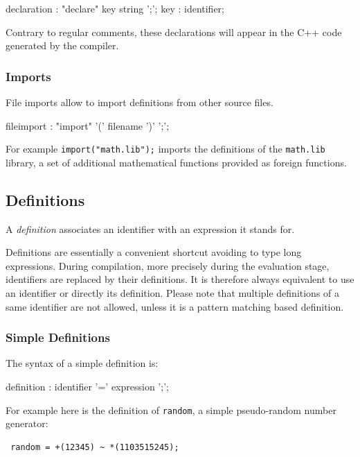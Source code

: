 \documentclass{article}
\begin{document}
\begin{rail}
declaration : "declare" key string ';';
key : identifier;
\end{rail}

Contrary to regular comments, these declarations will appear in the C++ code generated by the compiler.

\subsubsection{Imports}

File imports allow to import definitions from other source files.  

\begin{rail}
fileimport : "import" '(' filename ')' ';';
\end{rail}

For example \lstinline{import("math.lib");} imports the definitions of the \lstinline{math.lib} library, a set of additional mathematical functions provided as foreign functions.



\subsection{Definitions}

A \textit{definition} associates an identifier with an expression it stands for. 

Definitions are essentially a convenient shortcut avoiding to type long expressions. During compilation, more precisely during the evaluation stage, identifiers are replaced by their definitions. It is therefore always equivalent to use an identifier or directly its definition. Please note that multiple definitions of a same identifier are not allowed, unless it is a pattern matching based definition.

\subsubsection{Simple Definitions}

The syntax of a simple definition is:

\begin{rail}
definition  : identifier '=' expression ';';
\end{rail} 

For example here is the definition of \lstinline'random', a simple pseudo-random number generator:

\begin{lstlisting}
 random = +(12345) ~ *(1103515245);
\end{lstlisting}
\end{document}
